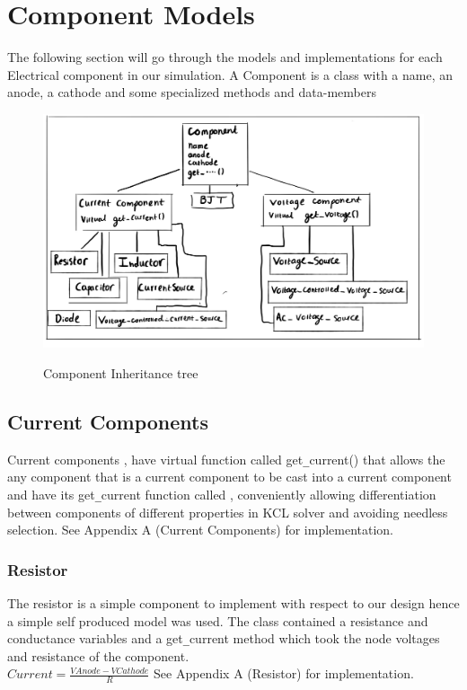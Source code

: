 \documentclass{article}
\begin{document}
\section{Component Models}
The following section will go through the models and implementations for each Electrical component in our simulation.
A Component is a class with a name, an anode, a cathode and some specialized methods and data-members
\begin{figure}[h]
    \caption{Component Inheritance tree}
    \centering
    \includegraphics[width=12cm]{images/Comphpp1.jpg}
    \label{fig:Comp}
\end{figure}

\subsection{Current Components}
Current components , have virtual function called get\verb|_|current() that allows the any component that is a current component to be cast into a current component and have its get\verb|_|current function called , conveniently allowing differentiation between components of different properties in KCL solver and avoiding needless selection.
\bigbreak
See Appendix A (Current Components) for implementation.
\medbreak


\subsubsection{Resistor}
The resistor is a simple component to implement with respect to our design hence a simple self produced model was used. The class contained a resistance and conductance variables and a get\verb|_|current method which took the node voltages and resistance of the component. \bigbreak\\$Current = \frac{VAnode - VCathode}{R}$
\bigbreak
See Appendix A (Resistor) for implementation.
\newpage
\end{document}
